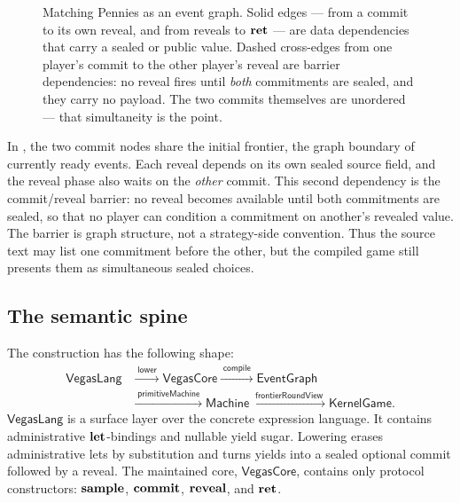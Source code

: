 \begin{figure}[t]
\centering
{}

\caption{Matching Pennies as an event graph.  Solid edges --- from a
commit to its own reveal, and from reveals to \(\mathbf{ret}\) --- are data
dependencies that carry a sealed or public value.  Dashed cross-edges
from one player's commit to the other player's reveal are barrier
dependencies: no reveal fires until \emph{both} commitments are sealed,
and they carry no payload.  The two commits themselves are unordered ---
that simultaneity is the point.}
\label{fig:matching-pennies-eg}
\end{figure}

In , the two commit nodes share the
initial frontier, the graph boundary of currently ready events.  Each
reveal depends on its own sealed source field, and the reveal phase also
waits on the \emph{other} commit.  This second dependency is the
commit/reveal barrier: no reveal becomes available until both
commitments are sealed, so that no player can condition a commitment on
another's revealed value.  The barrier is graph structure, not a
strategy-side convention.  Thus the source text may list one commitment
before the other, but the compiled game still presents them as
simultaneous sealed choices.

\subsection{The semantic spine}
\label{sec:intro:spine}

The construction has the following shape:
\[
\begin{aligned}
  \mathsf{VegasLang}
  &\xrightarrow{\;\mathsf{lower}\;}
  \mathsf{VegasCore}
  \xrightarrow{\;\mathsf{compile}\;}
  \mathsf{EventGraph} \\
  &\xrightarrow{\;\mathsf{primitiveMachine}\;}
  \mathsf{Machine}
  \xrightarrow{\;\mathsf{frontierRoundView}\;}
  \mathsf{KernelGame}.
\end{aligned}
\]
\(\mathsf{VegasLang}\) is a surface layer over the concrete expression
language.  It contains administrative \(\mathbf{let}\)-bindings and nullable
yield sugar.  Lowering erases administrative lets by substitution and
turns yields into a sealed optional commit followed by a reveal.  The
maintained core, \(\mathsf{VegasCore}\), contains only protocol
constructors: \(\mathbf{sample}\), \(\mathbf{commit}\), \(\mathbf{reveal}\), and \(\mathbf{ret}\).

